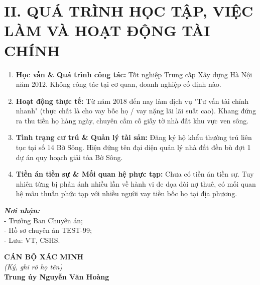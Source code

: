 \documentclass[12pt,a4paper]{article}
\begin{document}
\section*{II. QUÁ TRÌNH HỌC TẬP, VIỆC LÀM VÀ HOẠT ĐỘNG TÀI CHÍNH}
\begin{enumerate}[label=\arabic*., leftmargin=1.5cm]
    \item \textbf{Học vấn \& Quá trình công tác:} Tốt nghiệp Trung cấp Xây dựng Hà Nội năm 2012. Không công tác tại cơ quan, doanh nghiệp cố định nào. 
    \item \textbf{Hoạt động thực tế:} Từ năm 2018 đến nay làm dịch vụ "Tư vấn tài chính nhanh" (thực chất là cho vay bốc họ / vay nặng lãi lãi suất cao). Khang đứng ra thu tiền họ hàng ngày, chuyên cầm cố giấy tờ nhà đất khu vực ven sông.
    \item \textbf{Tình trạng cư trú \& Quản lý tài sản:} Đăng ký hộ khẩu thường trú liên tục tại số 14 Bờ Sông. Hiện đứng tên đại diện quản lý nhà đất đền bù đợt 1 dự án quy hoạch giải tỏa Bờ Sông.
    \item \textbf{Tiền án tiền sự \& Mối quan hệ phực tạp:} Chưa có tiền án tiền sự. Tuy nhiên từng bị phản ánh nhiều lần về hành vi đe dọa đòi nợ thuê, có mối quan hệ mâu thuẫn phức tạp với nhiều người vay tiền bốc họ tại địa phương.
\end{enumerate}

\vspace{0.8cm}

\noindent
\begin{minipage}[t]{0.45\textwidth}
    \small
    \textbf{\textit{Nơi nhận:}}\\
    - Trưởng Ban Chuyên án;\\
    - Hồ sơ chuyên án TEST-99;\\
    - Lưu: VT, CSHS.
\end{minipage}
\hfill
\begin{minipage}[t]{0.5\textwidth}
    \begin{center}
        \small
        \textbf{CÁN BỘ XÁC MINH}\\
        \textit{(Ký, ghi rõ họ tên)}\\[1.5cm]
        \textbf{Trung úy Nguyễn Văn Hoàng}
    \end{center}
\end{minipage}
\end{document}
